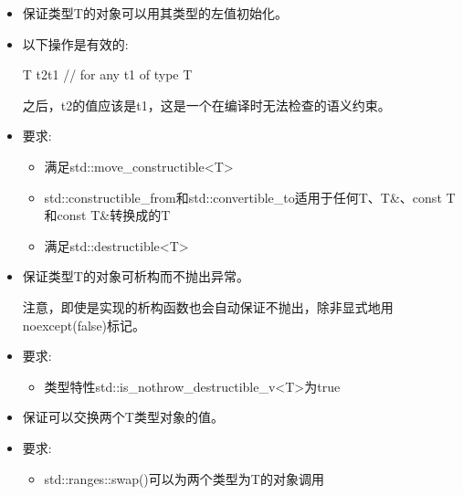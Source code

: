 \begin{itemize}
\item
保证类型T的对象可以用其类型的左值初始化。

\item
以下操作是有效的:

\begin{cpp}
T t2{t1} // for any t1 of type T
\end{cpp}

之后，t2的值应该是t1，这是一个在编译时无法检查的语义约束。

\item
要求:
\begin{itemize}
\item
满足std::move\_constructible<T>

\item
std::constructible\_from和std::convertible\_to适用于任何T、T\&、const T和const T\&转换成的T

\item
满足std::destructible<T>
\end{itemize}
\end{itemize}


\begin{itemize}
\item
保证类型T的对象可析构而不抛出异常。

注意，即使是实现的析构函数也会自动保证不抛出，除非显式地用noexcept(false)标记。

\item
要求:
\begin{itemize}
\item
类型特性std::is\_nothrow\_destructible\_v<T>为true
\end{itemize}
\end{itemize}


\begin{itemize}
\item
保证可以交换两个T类型对象的值。

\item
要求:
\begin{itemize}
\item
std::ranges::swap()可以为两个类型为T的对象调用
\end{itemize}
\end{itemize}


